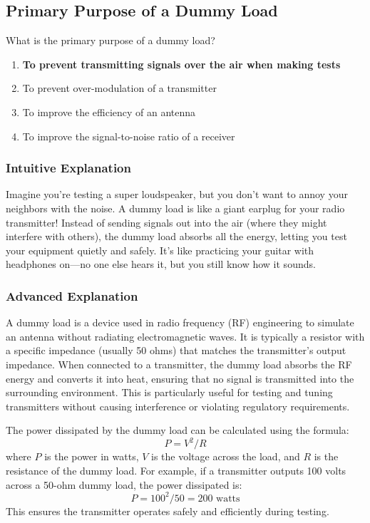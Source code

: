 \subsection{Primary Purpose of a Dummy Load}
\label{T7C01}

\begin{tcolorbox}[colback=gray!10!white,colframe=black!75!black,title=T7C01]
What is the primary purpose of a dummy load?  
\begin{enumerate}[label=\Alph*)]
    \item \textbf{To prevent transmitting signals over the air when making tests}
    \item To prevent over-modulation of a transmitter
    \item To improve the efficiency of an antenna
    \item To improve the signal-to-noise ratio of a receiver
\end{enumerate}
\end{tcolorbox}

\subsubsection{Intuitive Explanation}
Imagine you’re testing a super loudspeaker, but you don’t want to annoy your neighbors with the noise. A dummy load is like a giant earplug for your radio transmitter! Instead of sending signals out into the air (where they might interfere with others), the dummy load absorbs all the energy, letting you test your equipment quietly and safely. It’s like practicing your guitar with headphones on—no one else hears it, but you still know how it sounds.

\subsubsection{Advanced Explanation}
A dummy load is a device used in radio frequency (RF) engineering to simulate an antenna without radiating electromagnetic waves. It is typically a resistor with a specific impedance (usually 50 ohms) that matches the transmitter’s output impedance. When connected to a transmitter, the dummy load absorbs the RF energy and converts it into heat, ensuring that no signal is transmitted into the surrounding environment. This is particularly useful for testing and tuning transmitters without causing interference or violating regulatory requirements.

The power dissipated by the dummy load can be calculated using the formula:
\[
P = V^2 / R
\]
where \(P\) is the power in watts, \(V\) is the voltage across the load, and \(R\) is the resistance of the dummy load. For example, if a transmitter outputs 100 volts across a 50-ohm dummy load, the power dissipated is:
\[
P = 100^2 / 50 = 200 \text{ watts}
\]
This ensures the transmitter operates safely and efficiently during testing.

